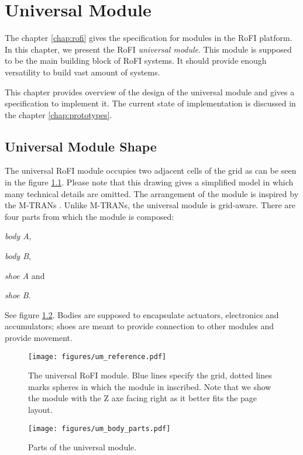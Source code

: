 \chapter{Universal Module}\label{chap:universal_module}

The chapter \ref{chap:rofi} gives the specification for modules in the RoFI
platform. In this chapter, we present the RoFI \emph{universal module}. This
module is supposed to be the main building block of RoFI systems. It should
provide enough versatility to build vast amount of systems.

This chapter provides overview of the design of the universal module and gives a
specification to implement it. The current state of implementation is discussed
in the chapter \ref{chap:prototypes}.

\section{Universal Module Shape}

The universal RoFI module occupies two adjacent cells of the grid as can be seen
in the figure \ref{fig:um_reference}. Please note that this drawing gives a
simplified model in which many technical details are omitted. The arrangement of
the module is inspired by the M-TRANs \cite{kurokawa_distributed_2008}. Unlike
M-TRANs, the universal module is grid-aware. There are four parts from which the
module is composed:
\begin{enumerate*}
    \item \emph{body A},
    \item \emph{body B},
    \item \emph{shoe A} and
    \item \emph{shoe B}.
\end{enumerate*}
See figure \ref{fig:um_body_parts}. Bodies are supposed to encapsulate
actuators, electronics and accumulators; shoes are meant to provide connection
to other modules and provide movement.

\begin{figure}
    \centering
    \texttt{[image: figures/um\_reference.pdf]}
    \caption{The universal RoFI module. Blue lines specify the grid, dotted
    lines marks spheres in which the module in inscribed. Note that we show the
    module with the Z axe facing right as it better fits  the page layout. }
    \label{fig:um_reference}
\end{figure}

\begin{figure}
    \centering
    \texttt{[image: figures/um\_body\_parts.pdf]}
    \caption{Parts of the universal module.}
    \label{fig:um_body_parts}
\end{figure}

